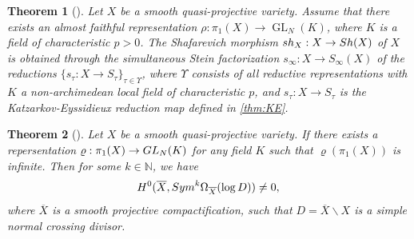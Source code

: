 \documentclass[10pt,a4paper]{amsart}
\newtheorem{thm}{Theorem}
\newcommand{\GL}{{\rm GL}}
\newcommand{\bN}{\mathbb{N}}
\begin{document}
\begin{thm}[{\cite[Theorem 3.9]{DY23b}}]\label{thm:Shapositive} 
	Let $X$ be a smooth quasi-projective variety. Assume that there exists an almost faithful representation $\rho \colon \pi_1(X) \to \operatorname{GL}_{N}(K)$, where $K$ is a field of   characteristic $p>0$.	The Shafarevich morphism ${\rm sh}_X:X\to {\rm Sh(X)}$ of $X$  is obtained through the simultaneous Stein factorization $s_\infty:X\to S_\infty(X)$  of the reductions   $\{s_{\tau}:X\to S_\tau\}_{\tau\in \Upsilon}$,  where
	$\Upsilon$ consists of all reductive representations with $K$  a non-archimedean local field of characteristic $p$,  and $s_\tau:X\to S_\tau$ is the Katzarkov-Eyssidieux reduction map  defined in \cref{thm:KE}.  
\end{thm} 

\begin{thm}[{\cite[Theorem B]{BDDM}}]\label{thm:sym}
	Let $X$ be a smooth quasi-projective variety. If there exists a repersentation $\varrho:\pi_1(X)\to\GL_{N}(K)$ for any field $K$ such that $\varrho(\pi_1(X))$ is infinite. Then  for some $k\in \bN$, 
	we have
	$$
	H^0(\overline{X}, {\rm Sym}^k\Omega_{\overline{X}}(\log D))\neq 0,
	$$
	where  $\overline{X}$ is a smooth projective compactification, such that $D=\overline{X}\backslash X$ is a simple normal crossing divisor. 
\end{thm}   
\end{document}
